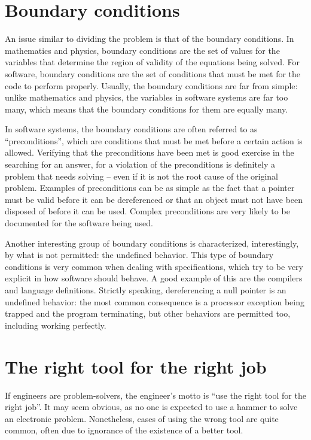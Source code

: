 \section*{Boundary conditions}

An issue similar to dividing the problem is that of the boundary conditions. In mathematics and physics, boundary conditions are the set of values for the variables that determine the region of validity of the equations being solved. For software, boundary conditions are the set of conditions that must be met for the code to perform properly. Usually, the boundary conditions are far from simple: unlike mathematics and physics, the variables in software systems are far too many, which means that the boundary conditions for them are equally many.

In software systems, the boundary conditions are often referred to as ``preconditions'', which are conditions that must be met before a certain action is allowed. Verifying that the preconditions have been met is good exercise in the searching for an answer, for a violation of the preconditions is definitely a problem that needs solving -- even if it is not the root cause of the original problem. Examples of preconditions can be as simple as the fact that a pointer must be valid before it can be dereferenced or that an object must not have been disposed of before it can be used. Complex preconditions are very likely to be documented for the software being used.

Another interesting group of boundary conditions is characterized, interestingly, by what is not permitted: the undefined behavior. This type of boundary conditions is very common when dealing with specifications, which try to be very explicit in how software should behave. A good example of this are the compilers and language definitions. Strictly speaking, dereferencing a null pointer is an undefined behavior: the most common consequence is a processor exception being trapped and the program terminating, but other behaviors are permitted too, including working perfectly.

\section*{The right tool for the right job}

If engineers are problem-solvers, the engineer’s motto is ``use the right tool for the right job''. It may seem obvious, as no one is expected to use a hammer to solve an electronic problem. Nonetheless, cases of using the wrong tool are quite common, often due to ignorance of the existence of a better tool.

